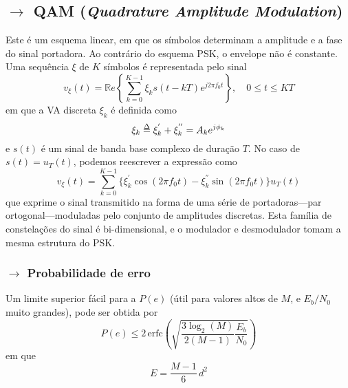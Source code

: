 \clearpage
\subsection[5.3 QAM (\textit{Quadrature Amplitude Modulation})]{$\rightarrow$ QAM (\textit{Quadrature Amplitude Modulation})}
\label{subsec:M-QAM}

\begin{mdframed}
    Este é um esquema linear, em que os símbolos determinam a amplitude e a fase do sinal portadora. Ao contrário do esquema PSK, o envelope não é constante. Uma sequência $\xi$ de $K$ símbolos é representada pelo sinal
    $$
        v_{\xi}(t) = \mathbb{R}e\left\{ \sum_{k=0}^{K-1} \xi_k s(t-kT) e^{j2\pi f_0 t} \right\},\quad 0 \leq t \leq KT
    $$
    em que a VA discreta $\xi_k$ é definida como
    $$
        \xi_k \delequal \xi_k^{'} + \xi_k^{''} = A_k e^{j\phi_k} 
    $$
    e $s(t)$ é um sinal de banda base complexo de duração $T$. No caso de $s(t) = u_T(t)$, podemos reescrever a expressão como
    $$
         v_{\xi}(t) = \sum_{k=0}^{K-1} \{ \xi_k^{'} \cos(2\pi f_0 t) - \xi_k^{''} \sin(2\pi f_0 t) \} u_T(t)
    $$
    que exprime o sinal transmitido na forma de uma série de portadoras---par ortogonal---moduladas pelo conjunto de amplitudes discretas. Esta família de constelações do sinal é bi-dimensional, e o modulador e desmodulador tomam a mesma estrutura do PSK. 
\end{mdframed}

\subsubsection[5.3.1 Probabilidade de erro]{$\rightarrow$ Probabilidade de erro}

Um limite superior fácil para a $P(e)$ (útil para valores altos de $M$, e $E_b/N_0$ muito grandes), pode ser obtida por 
$$
    P(e) \leq 2\, \text{erfc}\left( \sqrt{\frac{3 \log_2(M)}{2(M-1)}\frac{E_b}{N_0}} \right)
$$
em que 
$$
    E = \frac{M-1}{6}\, d^2
$$

\renewcommand*{\thefootnote}{\fnsymbol{footnote}}
\renewcommand*{\thefootnote}{\arabic{footnote}}

